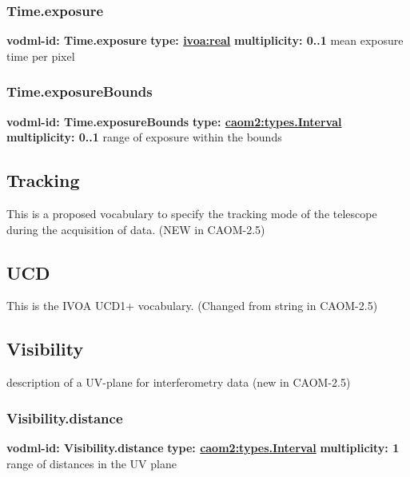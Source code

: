     \subsubsection{Time.exposure}
      \textbf{vodml-id: Time.exposure} \newline
      \textbf{type: \hyperref[sect:ivoa]{ivoa:real}} \newline
      \textbf{multiplicity: 0..1} \newline
      mean exposure time per pixel

    \subsubsection{Time.exposureBounds}
      \textbf{vodml-id: Time.exposureBounds} \newline
      \textbf{type: \hyperref[sect:types.Interval]{caom2:types.Interval}} \newline
      \textbf{multiplicity: 0..1} \newline
      range of exposure within the bounds

  \subsection{Tracking}
  \label{sect:Tracking}
    This is a proposed vocabulary to specify the tracking mode of the telescope during the acquisition of data. (NEW in CAOM-2.5)

  \subsection{UCD}
  \label{sect:UCD}
    This is the IVOA UCD1+ vocabulary. (Changed from string in CAOM-2.5)

  \subsection{Visibility}
  \label{sect:Visibility}
    description of a UV-plane for interferometry data (new in CAOM-2.5)

    \subsubsection{Visibility.distance}
      \textbf{vodml-id: Visibility.distance} \newline
      \textbf{type: \hyperref[sect:types.Interval]{caom2:types.Interval}} \newline
      \textbf{multiplicity: 1} \newline
      range of distances in the UV plane

